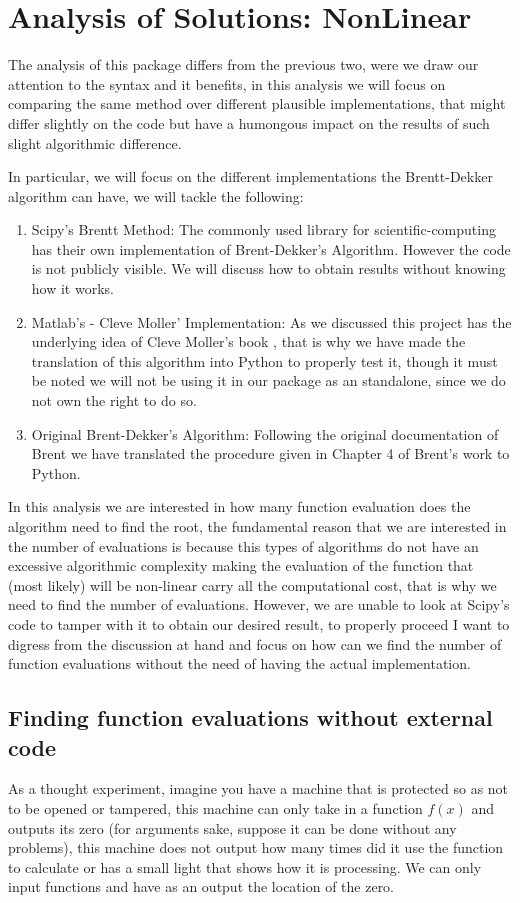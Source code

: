 \section{Analysis of Solutions: NonLinear}
The analysis of this package differs from the previous two, were we draw our attention to the syntax and it benefits, in this analysis we will focus on comparing the same method over different plausible implementations, that might differ slightly on the code but have a humongous impact on the results of such slight algorithmic difference.

In particular, we will focus on the different implementations the Brentt-Dekker algorithm can have, we will tackle the following:
\begin{enumerate}
    \item Scipy's Brentt Method: The commonly used library for scientific-computing has their own implementation of Brent-Dekker's Algorithm. However the code is not publicly visible. We will discuss how to obtain results without knowing how it works.
    \item Matlab's - Cleve Moller' Implementation: As we discussed this project has the underlying idea of Cleve Moller's book \cite{doi:10.1137/1.9780898717952}, that is why we have made the translation of this algorithm into Python to properly test it, though it must be noted we will not be using it in our package as an standalone, since we do not own the right to do so.
    \item Original Brent-Dekker's Algorithm: Following the original documentation of Brent \cite{brent2002algorithms} we have translated the procedure given in Chapter 4 of Brent's work to Python.
\end{enumerate}

In this analysis we are interested in how many function evaluation does the algorithm need to find the root, the fundamental reason that we are interested in the number of evaluations is because this types of algorithms do not have an excessive algorithmic complexity making the evaluation of the function that (most likely) will be non-linear carry all the computational cost, that is why we need to find the number of evaluations. However, we are unable to look at Scipy's code to tamper with it to obtain our desired result, to properly proceed I want to digress from the discussion at hand and focus on how can we find the number of function evaluations without the need of having the actual implementation.

\subsection{Finding function evaluations without external code}
As a thought experiment, imagine you have a machine that is protected so as not to be opened or tampered, this machine can only take in a function $f(x)$ and outputs its zero (for arguments sake, suppose it can be done without any problems), this machine does not output how many times did it use the function to calculate or has a small light that shows how it is processing. We can only input functions and have as an output the location of the zero. 




